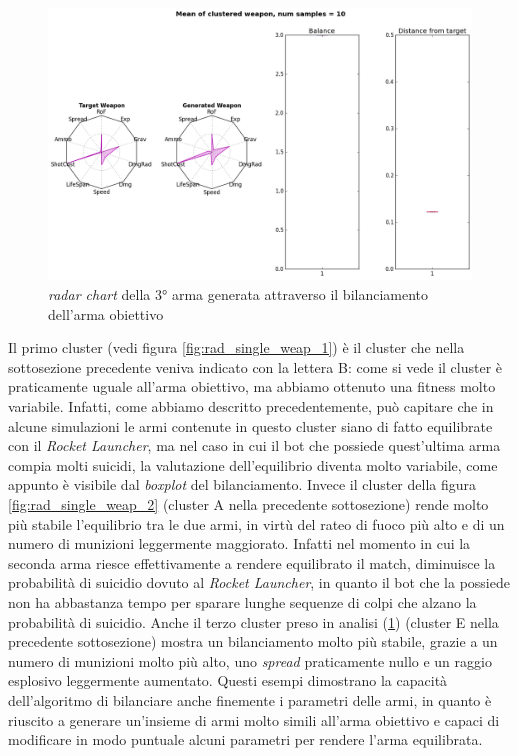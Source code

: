 \documentclass[12pt, italian]{toptesi}
\begin{document}
\begin{figure}[htp]
\centering
\includegraphics[width=1.0\textwidth]{rad_single_weap_3}
\caption{\emph{radar chart} della 3° arma generata  attraverso il bilanciamento dell'arma obiettivo}
\label{fig:rad_single_weap_3}
\end{figure}
Il primo cluster (vedi figura \ref{fig:rad_single_weap_1}) è il cluster che nella sottosezione precedente veniva indicato con la lettera B: come si vede il cluster è praticamente uguale all'arma obiettivo, ma abbiamo ottenuto una fitness molto variabile. Infatti, come abbiamo descritto precedentemente, può capitare che in alcune simulazioni le armi contenute in questo cluster siano di fatto equilibrate con il \emph{Rocket Launcher}, ma nel caso in cui il bot che possiede quest'ultima arma compia molti suicidi, la valutazione dell'equilibrio diventa molto variabile, come appunto è visibile dal \emph{boxplot} del bilanciamento.
Invece il cluster della figura \ref{fig:rad_single_weap_2} (cluster A nella precedente sottosezione) rende molto più stabile l'equilibrio tra le due armi, in virtù del rateo di fuoco più alto e di un numero di munizioni leggermente maggiorato. Infatti nel momento in cui la seconda arma riesce effettivamente a rendere equilibrato il match, diminuisce la probabilità di suicidio dovuto al \emph{Rocket Launcher},  in quanto il bot che la possiede non ha abbastanza tempo per sparare lunghe sequenze di colpi che alzano la probabilità di suicidio.
Anche il terzo cluster preso in analisi (\ref{fig:rad_single_weap_3}) (cluster E nella precedente sottosezione) mostra un bilanciamento molto più stabile, grazie a un numero di munizioni molto più alto, uno \emph{spread} praticamente nullo e un raggio esplosivo leggermente aumentato.
Questi esempi dimostrano la capacità dell'algoritmo di bilanciare anche finemente i parametri delle armi, in quanto è riuscito a generare un'insieme di armi molto simili all'arma obiettivo e capaci di modificare in modo puntuale alcuni parametri per rendere l'arma equilibrata.
\end{document}
